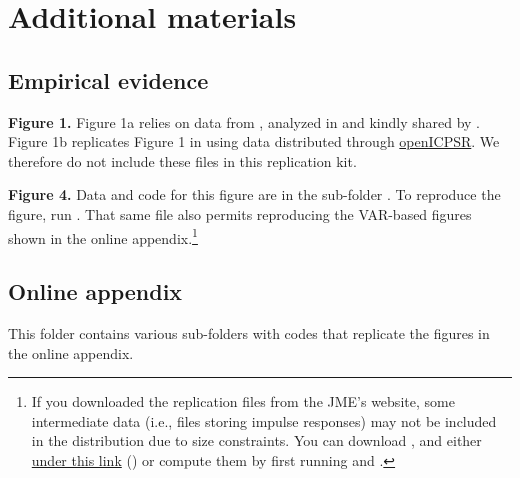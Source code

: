 \documentclass[12pt]{article}
\theoremstyle{plain}
\begin{document}
\section{Additional materials}
\subsection{Empirical evidence}
\textbf{Figure 1.} Figure 1a relies on data from \citet{fagerengMPCHeterogeneityHousehold2018}, analyzed in and kindly shared by \citet{auclertIntertemporalKeynesianCross2018}. Figure 1b replicates Figure 1 in \citet{jappelliFiscalPolicyMPC2014} using data distributed through \href{http://doi.org/10.3886/E116432V1}{openICPSR}. We therefore do not include these files in this replication kit.

\textbf{Figure 4.} Data and code for this figure are in the sub-folder . To reproduce the figure, run  . That same file also permits reproducing the VAR-based figures shown in the online appendix.\footnote{If you downloaded the replication files from the JME's website, some intermediate data (i.e.,  files storing impulse responses) may not be included in the distribution due to size constraints. You can download ,  and  either \href{https://github.com/LukasBFreund/ReplicationFiles/tree/main/WorkersCapitalistsGovernment}{under this link} () or compute them by first running  and .}

\subsection{Online appendix}
This folder contains various sub-folders with codes that replicate the figures in the online appendix.
\renewcommand\refname{References for documentation}
           
     
\end{document}
